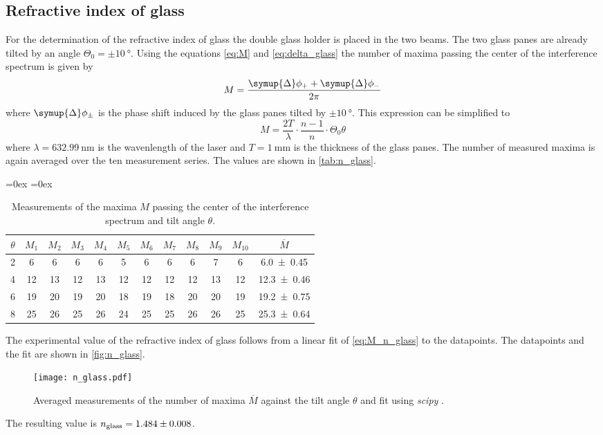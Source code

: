 \subsection{Refractive index of glass}
For the determination of the refractive index of glass the double glass holder is placed in the two beams. The two glass panes are already tilted by an angle 
$\Theta_0 = \pm\qty{10}{\degree}$. 
Using the equations \eqref{eq:M} and \eqref{eq:delta_glass} the number of maxima passing the center of the interference spectrum is given by
\begin{equation*}
  M = \frac{\symup{\Delta}\phi_+ + \symup{\Delta}\phi_-}{2\pi}
\end{equation*}
where $\symup{\Delta}\phi_\pm$ is the phase shift induced by the glass panes tilted by $\pm\qty{10}{\degree}$. 
This expression can be simplified to 
\begin{equation}
  \label{eq:M_n_glass}
  M = \frac{2T}{\lambda} \cdot \frac{n-1}{n} \cdot \Theta_0 \theta
\end{equation}
where $\lambda = \qty{632.99}{\nano\metre}$ is the wavenlength of the laser and $T = \qty{1}{\milli\metre}$ is the thickness of the glass panes.
The number of measured maxima is again averaged over the ten measurement series. The values are shown in \autoref{tab:n_glass}.
\begin{table}
  \centering
  \aboverulesep=0ex %
  \belowrulesep=0ex %
  \caption{Measurements of the maxima $M$ passing the center of the interference spectrum and tilt angle $\theta$.}
  \label{tab:n_glass}
  \begin{tabular}{c | c c c c c c c c c c | c}
    \toprule
    {$\theta$} & {$M_1$} & {$M_2$} & {$M_3$} & {$M_4$} & {$M_5$} & {$M_6$} & {$M_7$} & {$M_8$} & {$M_9$} & {$M_{10}$}  & {$\overline{M}$} \\
    \midrule
    \rule{0pt}{1.1EM}
    {2} &  6 &  6 &  6 &  6 &  5 &  6 &  6 &  6 &  7 &  6 & {\num{ 6.0 +- 0.45}} \\
    {4} & 12 & 13 & 12 & 13 & 12 & 12 & 12 & 12 & 13 & 12 & {\num{12.3 +- 0.46}} \\
    {6} & 19 & 20 & 19 & 20 & 18 & 19 & 18 & 20 & 20 & 19 & {\num{19.2 +- 0.75}} \\
    {8} & 25 & 26 & 25 & 26 & 24 & 25 & 25 & 26 & 26 & 25 & {\num{25.3 +- 0.64}} \\
    \bottomrule
  \end{tabular}
\end{table}
The experimental value of the refractive index of glass follows from a linear fit of \autoref{eq:M_n_glass} to the datapoints.
The datapoints and the fit are shown in \autoref{fig:n_glass}.
\begin{figure}
  \centering
  \texttt{[image: n\_glass.pdf]}
  \caption{Averaged measurements of the number of maxima $\overline{M}$ against the tilt angle $\theta$ and fit using \textit{scipy} \cite{scipy}.}
  \label{fig:n_glass}
\end{figure}
The resulting value is $n_\text{glass} = \num{1.484 +- 0.008}$.

